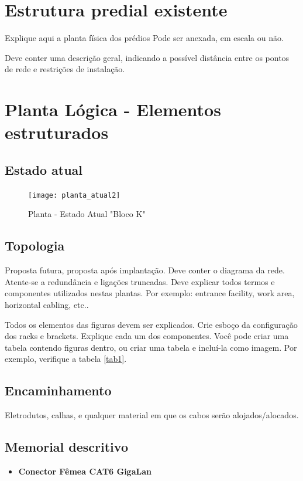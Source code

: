 \documentclass[	DIV=calc,%
							paper=a4,%
							fontsize=12pt,%
							onecolumn]{scrartcl}	 					%
\begin{document}
\section{Estrutura predial existente}

Explique aqui a planta física dos prédios
Pode ser anexada, em escala ou não.

Deve conter uma descrição geral, indicando a possível distância entre os pontos de rede e restrições de instalação.

\section{Planta Lógica - Elementos estruturados}

\subsection{Estado atual}
\begin{figure}
	\centering
	\caption{Planta - Estado Atual "Bloco K"}
	\texttt{[image: planta\_atual2]}
\end{figure}

\subsection{Topologia}
Proposta futura, proposta após implantação.
Deve conter o diagrama da rede. Atente-se a redundância  e ligações truncadas.
Deve explicar todos termos e componentes utilizados nestas plantas. Por exemplo: entrance facility, work area, horizontal cabling, etc..

Todos os elementos das figuras devem ser explicados. 
Crie esboço da configuração dos racks e brackets. Explique cada um dos componentes. Você pode criar uma tabela contendo figuras dentro, ou criar uma tabela e incluí-la como imagem. Por exemplo, verifique a tabela \ref{tab1}.



\subsection{Encaminhamento}
Eletrodutos, calhas, e qualquer material em que os cabos serão alojados/alocados.

\subsection{Memorial descritivo}

\begin{itemize}
	\item \textbf{Conector Fêmea CAT6 GigaLan} 
\end{itemize}
\end{document}
